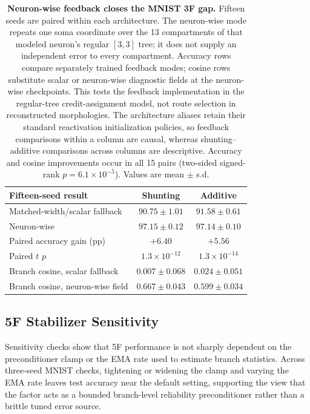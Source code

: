     \begin{table}[htbp]
    \centering
    \small
    \begin{tabular}{@{}lcc@{}}
    \toprule
    \textbf{Fifteen-seed result} & \textbf{Shunting} & \textbf{Additive} \\
    \midrule
    Matched-width/scalar fallback & $90.75\pm1.01$ & $91.58\pm0.61$ \\
    Neuron-wise & $\mathbf{97.15\pm0.12}$ & $\mathbf{97.14\pm0.10}$ \\
    \midrule
    Paired accuracy gain (pp) & $+6.40$ & $+5.56$ \\
    Paired $t$ $p$ & $1.3{\times}10^{-12}$ & $1.3{\times}10^{-14}$ \\
    \midrule
    Branch cosine, scalar fallback & $0.007\pm0.068$ & $0.024\pm0.051$ \\
    Branch cosine, neuron-wise field & $\mathbf{0.667\pm0.043}$ & $\mathbf{0.599\pm0.034}$ \\
    \bottomrule
    \end{tabular}
    \caption{\textbf{Neuron-wise feedback closes the MNIST 3F gap.} Fifteen seeds are paired within each architecture. The neuron-wise mode repeats one soma coordinate over the 13 compartments of that modeled neuron's regular $[3,3]$ tree; it does not supply an independent error to every compartment. Accuracy rows compare separately trained feedback modes; cosine rows substitute scalar or neuron-wise diagnostic fields at the neuron-wise checkpoints. This tests the feedback implementation in the regular-tree credit-assignment model, not route selection in reconstructed morphologies. The architecture aliases retain their standard reactivation initialization policies, so feedback comparisons within a column are causal, whereas shunting--additive comparisons across columns are descriptive. Accuracy and cosine improvements occur in all 15 pairs (two-sided signed-rank $p=6.1{\times}10^{-5}$). Values are mean $\pm$ s.d.}
    \label{tab:feedback_definition_control}
    \end{table}
    
    \subsection{5F Stabilizer Sensitivity}
    Sensitivity checks show that 5F performance is not sharply dependent on the preconditioner clamp or the EMA rate used to estimate branch statistics. Across three-seed MNIST checks, tightening or widening the clamp and varying the EMA rate leaves test accuracy near the default setting, supporting the view that the factor acts as a bounded branch-level reliability preconditioner rather than a brittle tuned error source.
    
